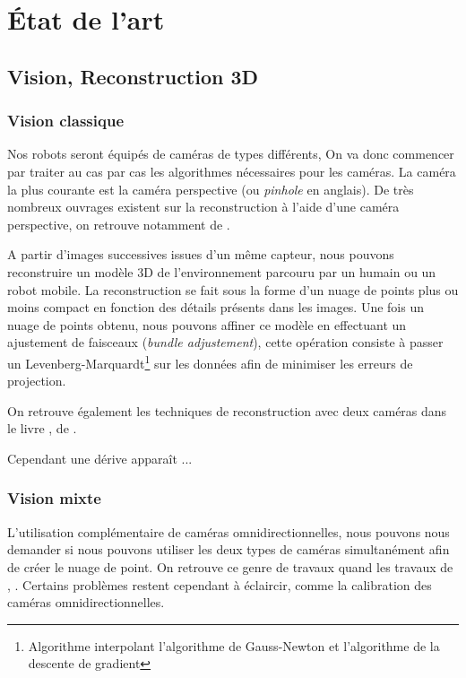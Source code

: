 \section{État de l'art}

\subsection{Vision, Reconstruction 3D}

\subsubsection{Vision classique}

Nos robots seront équipés de caméras de types différents, On va donc commencer par traiter au cas par cas les algorithmes nécessaires pour les caméras.
La caméra la plus courante est la caméra perspective (ou \textit{pinhole} en anglais).
De très nombreux ouvrages existent sur la reconstruction à l'aide d'une caméra perspective, on retrouve notamment   de \citeauthor{Hartley03Book} \cite{Hartley03Book}.

A partir d'images successives issues d'un même capteur, nous pouvons reconstruire un modèle 3D de l'environnement parcouru par un humain ou un robot mobile.
La reconstruction se fait sous la forme d'un nuage de points plus ou moins compact en fonction des détails présents dans les images.
Une fois un nuage de points obtenu, nous pouvons affiner ce modèle en effectuant un ajustement de faisceaux (\textit{bundle adjustement}), cette opération consiste à passer un Levenberg-Marquardt\footnote{Algorithme interpolant l'algorithme de Gauss-Newton et l'algorithme de la descente de gradient} sur les données afin de minimiser les erreurs de projection.

On retrouve également les techniques de reconstruction avec deux caméras dans le livre \cite{HoraudBook},  de \citeauthor{HoraudBook}.

Cependant une dérive apparaît ...


\subsubsection{Vision mixte}

L'utilisation complémentaire de caméras omnidirectionnelles, nous pouvons nous demander si nous pouvons utiliser les deux types de caméras simultanément afin de créer le nuage de point.
On retrouve ce genre de travaux quand les travaux de
\citeauthor{Sturm02},  \cite{Sturm02}.
Certains problèmes restent cependant à éclaircir, comme la calibration des caméras omnidirectionnelles.


